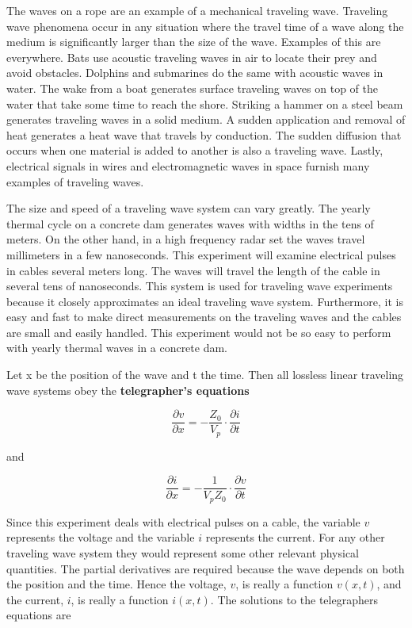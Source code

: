 The waves on a rope are an example of a mechanical traveling wave. Traveling wave phenomena occur in any situation where the travel time of a wave along the medium is significantly larger than the size of the wave. Examples of this are everywhere. Bats use acoustic traveling waves in air to locate their prey and avoid obstacles. Dolphins and submarines do the same with acoustic waves in water. The wake from a boat generates surface traveling waves on top of the water that take some time to reach the shore. Striking a hammer on a steel beam generates traveling waves in a solid medium. A sudden application and removal of heat generates a heat wave that travels by conduction. The sudden diffusion that occurs when one material is added to another is also a traveling wave. Lastly, electrical signals in wires and electromagnetic waves in space furnish many examples of traveling waves.

The size and speed of a traveling wave system can vary greatly. The yearly thermal cycle on a concrete dam generates waves with widths in the tens of meters. On the other hand, in a high frequency radar set the waves travel millimeters in a few nanoseconds. This experiment will examine electrical pulses in cables several meters long. The waves will travel the length of the cable in several tens of nanoseconds. This system is used for traveling wave experiments because it closely approximates an ideal traveling wave system. Furthermore, it is easy and fast to make direct measurements on the traveling waves and the cables are small and easily handled. This experiment would not be so easy to perform with yearly thermal waves in a concrete dam.

Let x be the position of the wave and t the time. Then all lossless linear traveling wave systems obey the {\bf telegrapher's equations}

\begin{equation}
\dfrac{\partial v}{\partial x}=-\dfrac{Z_0}{V_p}\cdot\dfrac{\partial i}{\partial t}
\label{equ:tw1}
\end{equation}

\noindent and

\begin{equation}
\dfrac{\partial i}{\partial x}=-\dfrac{1}{V_pZ_0}\cdot\dfrac{\partial v}{\partial t}
\label{equ:tw2}
\end{equation}

Since this experiment deals with electrical pulses on a cable, the variable $v$ represents the voltage and the variable $i$ represents the current. For any other traveling wave system they would represent some other relevant physical quantities. The partial derivatives are required because the wave depends on both the position and the time. Hence the voltage, $v$, is really a function $v(x,t)$, and the current, $i$, is really a function $i(x,t)$. The solutions to the telegraphers equations are

